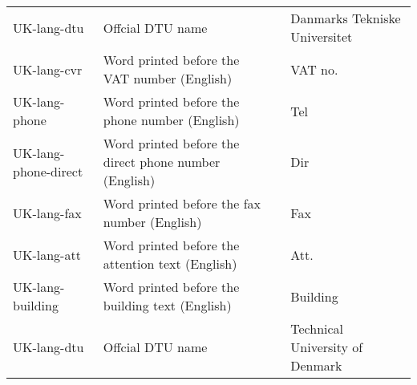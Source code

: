 \documentclass{dtuletter}
\begin{document}
\begin{longtable}{@{}>{\ttfamily}lp{75mm}>{\ttfamily}l>{}p{30mm}@{}}
UK-lang-dtu				& Offcial DTU name 										& & Danmarks Tekniske Universitet\\
UK-lang-cvr 			& Word printed before the VAT number (English) 			& & VAT no.  \\
UK-lang-phone 			& Word printed before the phone number (English) 		& & Tel      \\
UK-lang-phone-direct 	& Word printed before the direct phone number (English) & & Dir      \\
UK-lang-fax	 			& Word printed before the fax number (English)			& & Fax      \\
UK-lang-att 			& Word printed before the attention text (English)		& & Att.     \\
UK-lang-building  		& Word printed before the building text (English)		& & Building  \\
UK-lang-dtu				& Offcial DTU name 										& & Technical University of Denmark\\
\hline
\end{longtable}
\end{document}
